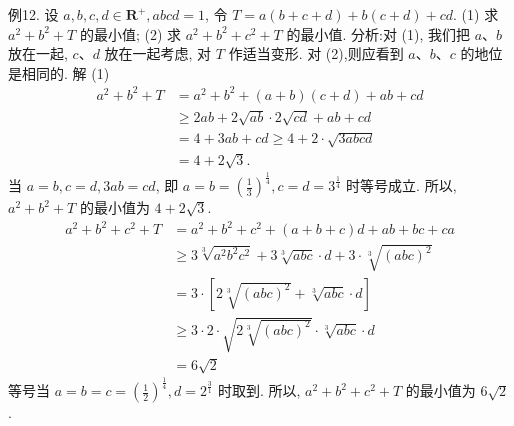 例12. 设 $a, b, c, d \in \mathbf{R}^{+}, a b c d=1$, 令 $T=a(b+c+d)+b(c+d)+c d$.
(1) 求 $a^2+b^2+T$ 的最小值;
(2) 求 $a^2+b^2+c^2+T$ 的最小值.
分析:对 (1), 我们把 $a 、 b$ 放在一起, $c 、 d$ 放在一起考虑, 对 $T$ 作适当变形.
对 (2),则应看到 $a 、 b 、 c$ 的地位是相同的.
解 (1)
$$
\begin{aligned}
a^2+b^2+T & =a^2+b^2+(a+b)(c+d)+a b+c d \\
& \geqslant 2 a b+2 \sqrt{a b} \cdot 2 \sqrt{c d}+a b+c d \\
& =4+3 a b+c d \geqslant 4+2 \cdot \sqrt{3 a b c d} \\
& =4+2 \sqrt{3} .
\end{aligned}
$$
当 $a=b, c=d, 3 a b=c d$, 即 $a=b=\left(\frac{1}{3}\right)^{\frac{1}{4}}, c=d=3^{\frac{1}{4}}$ 时等号成立.
所以, $a^2+b^2+T$ 的最小值为 $4+2 \sqrt{3}$.
$$
\begin{aligned}
a^2+b^2+c^2+T & =a^2+b^2+c^2+(a+b+c) d+a b+b c+c a \\
& \geqslant 3 \sqrt[3]{a^2 b^2 c^2}+3 \sqrt[3]{a b c} \cdot d+3 \cdot \sqrt[3]{(a b c)^2} \\
& =3 \cdot\left[2 \sqrt[3]{(a b c)^2}+\sqrt[3]{a b c} \cdot d\right] \\
& \geqslant 3 \cdot 2 \cdot \sqrt{2 \sqrt[3]{(a b c)^2}} \cdot \sqrt[3]{a b c} \cdot d \\
& =6 \sqrt{2}
\end{aligned}
$$
等号当 $a=b=c=\left(\frac{1}{2}\right)^{\frac{1}{4}}, d=2^{\frac{3}{1}}$ 时取到.
所以, $a^2+b^2+c^2+T$ 的最小值为 $6 \sqrt{2}$.



